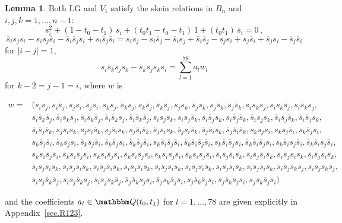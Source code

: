 \documentclass[12pt,reqno]{amsart}
\theoremstyle{definition}
\newtheorem{lemma}[theorem]{Lemma}
\def\BQ{\mathbbm Q}
\def\be{\begin{equation}}
\def\ee{\end{equation}}
\def\hs{\overline{s}}
\def\LG{\mathrm{LG}}
\begin{document}
\begin{lemma}
\label{lem.R123}  
Both $\LG$ and $V_1$ satisfy the skein relations in $B_n$ and
$i,j,k =1, \dots, n-1$: 
\be 
\label{R1}\tag{$R_1$}
s_i^2 + (1-t_0 - t_1) \, s_i + (t_0 t_1 - t_0 - t_1) \,1
+ (t_0 t_1) \, \hs_i = 0 \,,
\ee
\be
\label{R2}\tag{$R_2$}
\hs_i s_j s_i - s_i s_j \hs_i - \hs_i \hs_j s_i + s_i \hs_j \hs_i =
s_i s_j - s_i \hs_j - \hs_i s_j + \hs_i \hs_j - s_j s_i + s_j \hs_i
+ \hs_j s_i - \hs_j \hs_i 
\ee
 for $|i-j|=1$,
\be
\label{R3}
\tag{$R_3$}
s_i \hs_k s_j \hs_k - \hs_k s_j \hs_k s_i = \sum_{l=1}^{78} a_l w_l 
\ee
for $k-2=j-1=i$, where $w$ is 
\begin{small}
\be
\label{w78}
\begin{aligned}
  w = & (s_i s_j, s_i \hs_j, s_j s_i, \hs_j s_i, s_k s_j, \hs_k s_j, s_k \hs_j,
  \hs_k \hs_j, s_j s_k, \hs_j s_k, s_j \hs_k, \hs_j \hs_k, s_i s_k s_j,
  s_i s_k \hs_j, s_i \hs_k s_j, \\ & s_i \hs_k \hs_j, \hs_i s_k s_j, \hs_i s_k \hs_j,
  \hs_i \hs_k s_j, \hs_i \hs_k \hs_j , s_i s_j s_k, s_i s_j \hs_k,
  s_i \hs_j s_k , s_i \hs_j \hs_k, \hs_i s_j s_k, \hs_i s_j \hs_k,
  \hs_i \hs_j s_k, \\ & \hs_i \hs_j \hs_k, s_j s_i s_k, s_j s_i \hs_k, s_j \hs_i s_k,
  s_j \hs_i \hs_k, \hs_j s_i s_k, \hs_j s_i \hs_k, \hs_j \hs_i s_k,
  \hs_j \hs_i \hs_k, s_k s_j s_i, s_k s_j \hs_i, s_k \hs_j s_i, \\ &
  s_k \hs_j \hs_i, \hs_k s_j s_i, \hs_k s_j \hs_i, \hs_k \hs_j s_i,
  \hs_k \hs_j \hs_i, s_k \hs_i \hs_j \hs_i, \hs_k \hs_i \hs_j \hs_i,
  s_k \hs_i \hs_j s_i, \hs_k \hs_i \hs_j s_i, s_k \hs_i s_j \hs_i,
  \hs_k \hs_i s_j \hs_i, \\ & s_k s_i \hs_j \hs_i, \hs_k s_i \hs_j \hs_i, 
  s_k s_i \hs_j s_i, \hs_k s_i \hs_j s_i, s_k s_i s_j \hs_i,
  \hs_k s_i s_j \hs_i, \hs_i \hs_j \hs_i s_k, \hs_i \hs_j \hs_i \hs_k, 
  \hs_i \hs_j s_i s_k,  \hs_i \hs_j s_i \hs_k, \\ & \hs_i s_j \hs_i s_k, 
  \hs_i s_j \hs_i \hs_k, s_i \hs_j \hs_i s_k, s_i \hs_j \hs_i \hs_k,
  s_i \hs_j s_i s_k, s_i \hs_j s_i \hs_k, s_i s_j \hs_i s_k,
  s_i s_j \hs_i \hs_k, s_i \hs_j \hs_k s_j, s_i \hs_j s_k \hs_j, \\ &
  s_i s_j \hs_k \hs_j, s_i s_j \hs_k s_j, s_i s_j s_k \hs_j,
  \hs_j \hs_k s_j s_i, \hs_j s_k \hs_j s_i, s_j \hs_k \hs_j s_i,
  s_j \hs_k s_j s_i, s_j s_k \hs_j s_i) 
\end{aligned}
\ee
\end{small}
and the coefficients
$a_l \in \BQ(t_0,t_1)$ for $l=1,\ldots,78$ are given explicitly
in Appendix~\ref{sec.R123}.
\end{lemma}
\end{document}
